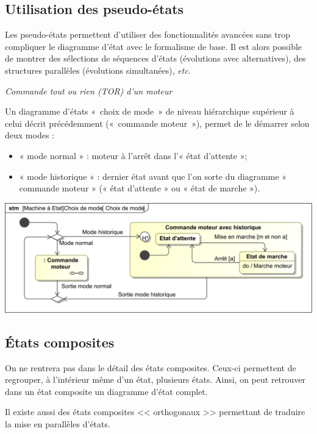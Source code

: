 \documentclass[10pt,fleqn]{article} %
\begin{document}
\subsection{Utilisation des pseudo-états}


\begin{defi}
Les pseudo-états permettent d’utiliser des fonctionnalités avancées sans trop compliquer le diagramme d’état avec le formalisme de base.
Il est alors possible de montrer des sélections de séquences d’états (évolutions avec alternatives), des structures parallèles (évolutions simultanées), \textit{etc}.
\end{defi}

\begin{exemple}

\textit{Commande tout ou rien (TOR) d’un moteur}

Un diagramme d’états «~choix de mode~» de niveau hiérarchique supérieur à celui décrit précédemment («~commande moteur~»), permet de le démarrer selon deux modes :
\begin{itemize}
\item « mode normal » : moteur à l’arrêt dans l’« état d’attente »;
\item « mode historique » : dernier état avant que l’on sorte du diagramme « commande moteur » (« état d’attente » ou « état de marche »).
\end{itemize}

\begin{center}
\includegraphics[width=.8\textwidth]{images/ChoixMode}
\end{center}
\end{exemple}

\subsection{États composites}
On ne rentrera pas dans le détail des états composites. Ceux-ci permettent de regrouper, à l'intérieur même d'un état, plusieurs états. Ainsi, on peut retrouver dans un état composite un diagramme d'état complet.

Il existe aussi des états composites << orthogonaux >> permettant de traduire la mise en parallèles d'états. 
\end{document}
